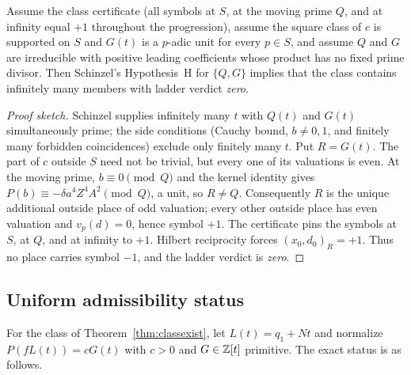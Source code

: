 \begin{theorem}
\label{thm:schinzel}
Assume the class certificate (all symbols at $S$, at the moving prime
$Q$, and at infinity equal $+1$ throughout the progression), assume the
square class of $c$ is supported on $S$ and $G(t)$ is a $p$-adic unit for
every $p\in S$, and assume $Q$ and $G$ are irreducible with positive
leading coefficients whose product has no fixed prime divisor.  Then
Schinzel's Hypothesis~H for $\{Q,G\}$ implies that the class contains
infinitely many members with ladder verdict \emph{zero}.
\end{theorem}

\begin{proof}[Proof sketch]
Schinzel supplies infinitely many $t$ with $Q(t)$ and $G(t)$
simultaneously prime; the side conditions (Cauchy bound, $b\ne0,1$, and
finitely many forbidden coincidences) exclude only finitely many $t$.
Put $R=G(t)$.  The part of $c$ outside $S$ need not be trivial, but every
one of its valuations is even.  At the moving prime, $b\equiv0\pmod Q$
and the kernel identity gives
$P(b)\equiv-\delta a^4Z^4A^2\pmod Q$, a unit, so $R\ne Q$.
Consequently $R$ is the unique additional outside place of odd valuation;
every other outside place has even valuation and $v_p(d)=0$, hence symbol
$+1$.  The certificate pins the symbols at $S$, at $Q$, and at infinity
to $+1$.  Hilbert reciprocity forces $(x_0,d_0)_R=+1$.  Thus no place
carries symbol $-1$, and the ladder verdict is \emph{zero}.
\end{proof}

\subsection{Uniform admissibility status}

For the class of Theorem~\ref{thm:classexist}, let
$L(t)=q_1+Nt$ and normalize
$P(fL(t))=cG(t)$ with $c>0$ and $G\in\mathbb{Z}[t]$ primitive.  The exact status
is as follows.

